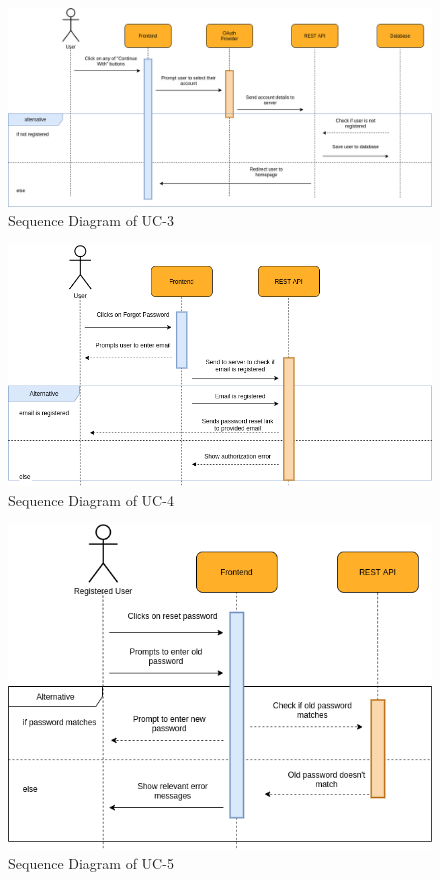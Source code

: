 \begin{figure}[H]
    \centering
    \includegraphics[scale=0.5]{./diagrams/sequence/seq-03.png}
    \caption{Sequence Diagram of UC-3}
    \label{fig:seq-03}
    
\end{figure}


\begin{figure}[H]
    \centering
    \includegraphics[scale=0.5]{./diagrams/sequence/seq-04.png}
    \caption{Sequence Diagram of UC-4}
    \label{fig:seq-04}
    
\end{figure}


\begin{figure}[H]
    \centering
    \includegraphics[scale=0.5]{./diagrams/sequence/seq-05.png}
    \caption{Sequence Diagram of UC-5}
    \label{fig:seq-05}
    
\end{figure}


